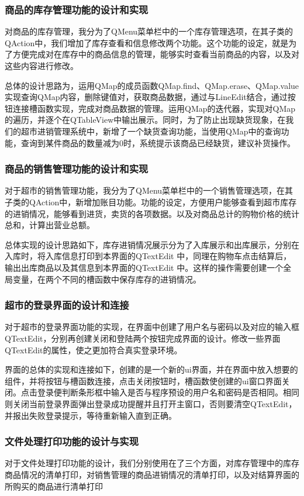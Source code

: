 \documentclass[
   projtype=report, %
   output=print,     %
  ]{nwafuprojrep}
\begin{document}
\subsubsection{商品的库存管理功能的设计和实现}
对商品的库存管理，我分为了QMenu菜单栏中的一个库存管理选项，在其子类的QAction中，我们增加了库存查看和信息修改两个功能。这个功能的设定，就是为了方便完成对在库存中的商品信息的管理，能够实时查看当前商品的内容，以及对这些内容进行修改。

总体的设计思路为，运用QMap的成员函数QMap.find、QMap.erase、QMap.value实现查询QMap内容，删除键值对，获取商品数据，通过与LineEdit结合，通过按钮连接槽函数实现，完成对商品数据的管理。运用QMap的迭代器，实现对QMap的遍历，并逐个在QTableView中输出展示。同时，为了防止出现缺货现象，在我们的超市进销管理系统中，新增了一个缺货查询功能，当使用QMap中的查询功能，查询到某件商品的数量减为0时，系统提示该商品已经缺货，建议补货操作。

\subsubsection{商品的销售管理功能的设计和实现}
对于超市的销售管理功能，我分为了QMenu菜单栏中的一个销售管理选项，在其子类的QAction中，新增加账目功能。功能的设定，方便用户能够查看到超市库存的进销情况，能够看到进货，卖货的各项数据。以及对商品总计的购物价格的统计总和，计算出营业总额。

总体实现的设计思路如下，库存进销情况展示分为了入库展示和出库展示，分别在入库时，将入库信息打印到本界面的QTextEdit 中，同理在购物车点击结算后，输出出库商品以及其信息到本界面的QTextEdit 中。这样的操作需要创建一个全局变量，在两个不同的槽函数中保存库存的进销情况。
\subsubsection{超市的登录界面的设计和连接}
对于超市的登录界面功能的实现，在界面中创建了用户名与密码以及对应的输入框QTextEdit，分别再创建关闭和登陆两个按钮完成界面的设计。修改一些界面QTextEdit的属性，使之更加符合真实登录环境。

界面的总体的实现和连接如下，创建的是一个新的ui界面，并在界面中放入想要的组件，并将按钮与槽函数连接，点击关闭按钮时，槽函数使创建的ui窗口界面关闭。点击登录便判断条形框中输入是否与程序预设的用户名和密码是否相同。相同则关闭当前登录界面弹出登录成功提醒并且打开主窗口，否则要清空QTextEdit，并报出失败登录提示，等待重新输入直到正确。
\subsubsection{文件处理打印功能的设计与实现}
对于文件处理打印功能的设计，我们分别使用在了三个方面，对库存管理中的库存商品情况的清单打印，对销售管理的商品进销情况的清单打印，以及对结算界面的所购买的商品进行清单打印
\end{document}
